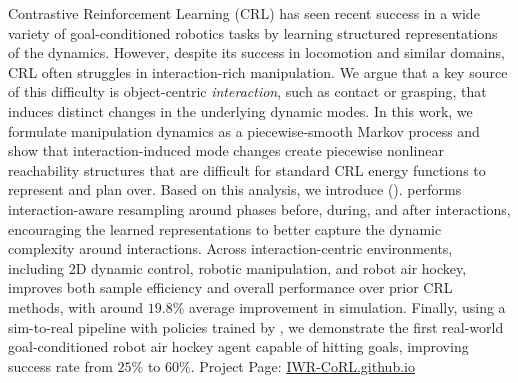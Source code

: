 Contrastive Reinforcement Learning (CRL) has seen recent success in a wide variety of goal-conditioned robotics tasks by learning structured representations of the dynamics. However, despite its success in locomotion and similar domains, CRL often struggles in interaction-rich manipulation. We argue that a key source of this difficulty is object-centric \textit{interaction}, such as contact or grasping, that induces distinct changes in the underlying dynamic modes. In this work, we formulate manipulation dynamics as a piecewise-smooth Markov process and show that interaction-induced mode changes create piecewise nonlinear reachability structures that are difficult for standard CRL energy functions to represent and plan over. Based on this analysis, we introduce \methodname{} (\methodshort{}). \methodshort{} performs interaction-aware resampling around phases before, during, and after interactions, encouraging the learned representations to better capture the dynamic complexity around interactions. Across interaction-centric environments, including 2D dynamic control, robotic manipulation, and robot air hockey, \methodshort{} improves both sample efficiency and overall performance over prior CRL methods, with around $19.8\%$ average improvement in simulation. Finally, using a sim-to-real pipeline with policies trained by \methodshort{}, we demonstrate the first real-world goal-conditioned robot air hockey agent capable of hitting goals, improving success rate from $25\%$ to $60\%$.
Project Page: \href{IWR-CoRL.github.io}{IWR-CoRL.github.io}
